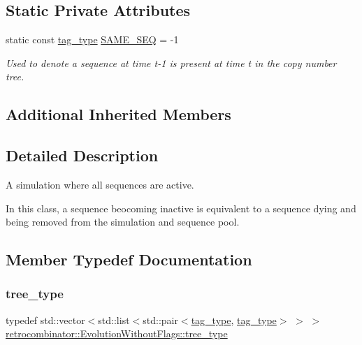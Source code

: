 \subsection*{Static Private Attributes}
\begin{DoxyCompactItemize}
\item 
\mbox{\label{classretrocombinator_1_1EvolutionWithoutFlags_a25081461cff1a2b2cc6a613c71383778}} 
static const \hyperlink{constants_8h_afd7c6eb4293e8c4d12827609a9a34b9b}{tag\+\_\+type} \hyperlink{classretrocombinator_1_1EvolutionWithoutFlags_a25081461cff1a2b2cc6a613c71383778}{S\+A\+M\+E\+\_\+\+S\+EQ} = -\/1
\begin{DoxyCompactList}\small\item\em Used to denote a sequence at time {\itshape t-\/1} is present at time {\itshape t} in the copy number tree. \end{DoxyCompactList}\end{DoxyCompactItemize}
\subsection*{Additional Inherited Members}


\subsection{Detailed Description}
A simulation where all sequences are active. 

In this class, a sequence beocoming inactive is equivalent to a sequence dying and being removed from the simulation and sequence pool. 

\subsection{Member Typedef Documentation}
\mbox{\label{classretrocombinator_1_1EvolutionWithoutFlags_ac6bd9b8af2b258bf76aae5b62ef78327}} 
\subsubsection{\texorpdfstring{tree\+\_\+type}{tree\_type}}
{\footnotesize\ttfamily typedef std\+::vector$<$std\+::list$<$std\+::pair$<$\hyperlink{constants_8h_afd7c6eb4293e8c4d12827609a9a34b9b}{tag\+\_\+type}, \hyperlink{constants_8h_afd7c6eb4293e8c4d12827609a9a34b9b}{tag\+\_\+type}$>$ $>$ $>$ \hyperlink{classretrocombinator_1_1EvolutionWithoutFlags_ac6bd9b8af2b258bf76aae5b62ef78327}{retrocombinator\+::\+Evolution\+Without\+Flags\+::tree\+\_\+type}}



